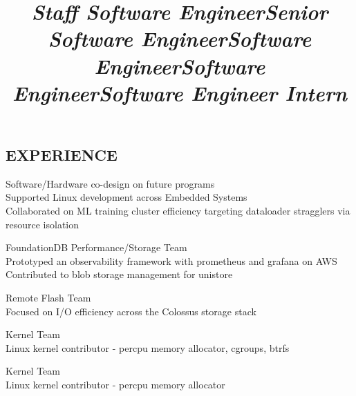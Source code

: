 \documentclass[margin,11pt]{res}
\begin{document}
\begin{resume}

\section{EXPERIENCE}
\title{\sl{Staff Software Engineer}}
\begin{position}
Software/Hardware co-design on future programs\\
Supported Linux development across Embedded Systems\\
Collaborated on ML training cluster efficiency targeting dataloader stragglers via resource isolation
\end{position}


\title{\sl{Senior Software Engineer}}
\begin{position}
FoundationDB Performance/Storage Team\\
Prototyped an observability framework with prometheus and grafana on AWS\\
Contributed to blob storage management for unistore 
\end{position}

\title{\sl{Software Engineer}}
\begin{position}
Remote Flash Team\\
Focused on I/O efficiency across the Colossus storage stack
\end{position}

\title{\sl{Software Engineer}}
\begin{position}
Kernel Team\\
Linux kernel contributor - percpu memory allocator, cgroups, btrfs
\end{position}

\vspace{-24pt}
\employer{}
\location{}
\title{\sl{Software Engineer Intern}}
\begin{position}
Kernel Team\\
Linux kernel contributor - percpu memory allocator
\end{position}


\end{resume}
\end{document}
